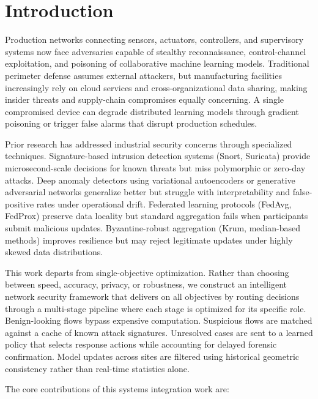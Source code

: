 \documentclass[preprint,12pt]{elsarticle}
\begin{document}
\section{Introduction}

Production networks connecting sensors, actuators, controllers, and supervisory systems now face adversaries capable of stealthy reconnaissance, control-channel exploitation, and poisoning of collaborative machine learning models. Traditional perimeter defense assumes external attackers, but manufacturing facilities increasingly rely on cloud services and cross-organizational data sharing, making insider threats and supply-chain compromises equally concerning. A single compromised device can degrade distributed learning models through gradient poisoning or trigger false alarms that disrupt production schedules.

Prior research has addressed industrial security concerns through specialized techniques. Signature-based intrusion detection systems (Snort, Suricata) provide microsecond-scale decisions for known threats but miss polymorphic or zero-day attacks. Deep anomaly detectors using variational autoencoders or generative adversarial networks generalize better but struggle with interpretability and false-positive rates under operational drift. Federated learning protocols (FedAvg, FedProx) preserve data locality but standard aggregation fails when participants submit malicious updates. Byzantine-robust aggregation (Krum, median-based methods) improves resilience but may reject legitimate updates under highly skewed data distributions.

This work departs from single-objective optimization. Rather than choosing between speed, accuracy, privacy, or robustness, we construct an intelligent network security framework that delivers on all objectives by routing decisions through a multi-stage pipeline where each stage is optimized for its specific role. Benign-looking flows bypass expensive computation. Suspicious flows are matched against a cache of known attack signatures. Unresolved cases are sent to a learned policy that selects response actions while accounting for delayed forensic confirmation. Model updates across sites are filtered using historical geometric consistency rather than real-time statistics alone.

The core contributions of this systems integration work are:
\end{document}
